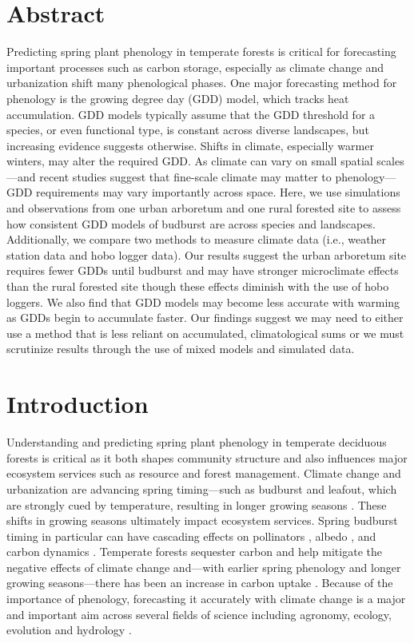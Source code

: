 \documentclass{article}\usepackage[]{graphicx}\usepackage[]{color}
\begin{document}
\section*{Abstract} 
Predicting spring plant phenology in temperate forests is critical for forecasting important processes such as carbon storage, especially as climate change and urbanization shift many phenological phases. One major forecasting method for phenology is the growing degree day (GDD) model, which tracks heat accumulation. GDD models typically assume that the GDD threshold for a species, or even functional type, is constant across diverse landscapes, but increasing evidence suggests otherwise. Shifts in climate, especially warmer winters, may alter the required GDD. As climate can vary on small spatial scales---and recent studies suggest that fine-scale climate may matter to phenology---GDD requirements may vary importantly across space. Here, we use simulations and observations from one urban arboretum and one rural forested site to assess how consistent GDD models of budburst are across species and landscapes. Additionally, we compare two methods to measure climate data (i.e., weather station data and hobo logger data). Our results suggest the urban arboretum site requires fewer GDDs until budburst and may have stronger microclimate effects than the rural forested site though these effects diminish with the use of hobo loggers. We also find that GDD models may become less accurate with warming as GDDs begin to accumulate faster. Our findings suggest we may need to either use a method that is less reliant on accumulated, climatological sums or we must scrutinize results through the use of mixed models and simulated data.

\section*{Introduction}

Understanding and predicting spring plant phenology in temperate deciduous forests is critical as it both shapes community structure and also influences major ecosystem services such as resource and forest management. Climate change and urbanization are advancing spring timing---such as budburst and leafout, which are strongly cued by temperature, resulting in longer growing seasons \citep{Chuine2001}. These shifts in growing seasons ultimately impact ecosystem services. Spring budburst timing in particular can have cascading effects on pollinators \citep{Boggs2012, Pardee2017}, albedo \citep{Williamson2016}, and carbon dynamics \citep{Richardson2013}. Temperate forests sequester carbon and help mitigate the negative effects of climate change and---with earlier spring phenology and longer growing seasons---there has been an increase in carbon uptake \citep{Keenan2014}. Because of the importance of phenology, forecasting it accurately with climate change is a major and important aim across several fields of science including agronomy, ecology, evolution and hydrology \citep{Moorcroft2001,Bolton2013,Yu2016,Taylor2020}. 
  
\end{document}
